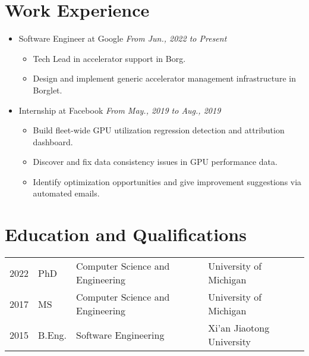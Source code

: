 \documentclass[letterpaper,11pt]{article}
\begin{document}
\maketitle

\section{Work Experience}
\begin{itemize}
    \item Software Engineer at Google
        \hfill \textit{From Jun., 2022 to Present}
    \begin{itemize}
        \item Tech Lead in accelerator support in Borg.
        \item Design and implement generic accelerator management infrastructure in Borglet.
    \end{itemize}
\end{itemize}
\begin{itemize}
    \item Internship at Facebook \hfill \textit{From May., 2019 to Aug., 2019}
    \begin{itemize}
        \item Build fleet-wide GPU utilization regression detection and attribution dashboard.
        \item Discover and fix data consistency issues in GPU performance data.
        \item Identify optimization opportunities and give improvement suggestions via automated 
emails.
    \end{itemize}

\end{itemize}

\section{Education and Qualifications}

\begin{tabular}{llll}
    2022 & PhD  & Computer Science and Engineering & University of Michigan \\
    2017 & MS   & Computer Science and Engineering & University of Michigan \\
    2015 & B.Eng. & Software Engineering & Xi'an Jiaotong University
\end{tabular}

\begin{publications}
\end{publications}
\end{document}
